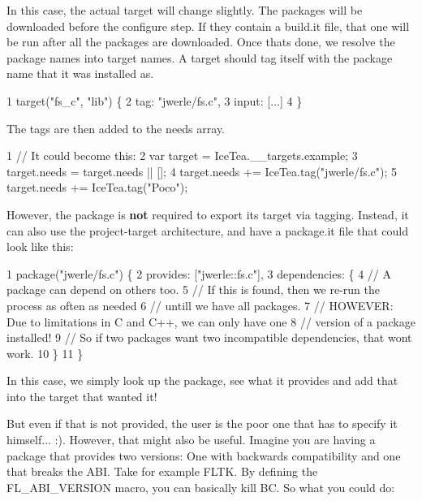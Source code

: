 In this case, the actual target will change slightly. The packages will be downloaded before the configure step. If they contain a {\ttfamily build.\+it} file, that one will be run after all the packages are downloaded. Once that\textquotesingle{}s done, we resolve the package names into target names. A target should tag itself with the package name that it was installed as.


\begin{DoxyCode}
1 target("fs\_c", "lib") \{
2     tag: "jwerle/fs.c",
3     input: [...]
4 \}
\end{DoxyCode}


The tags are then added to the {\ttfamily needs} array.


\begin{DoxyCode}
1 // It could become this:
2 var target = IceTea.\_\_targets.example;
3 target.needs = target.needs || [];
4 target.needs += IceTea.tag("jwerle/fs.c");
5 target.needs += IceTea.tag("Poco");
\end{DoxyCode}


However, the package is {\bfseries not} required to export it\textquotesingle{}s target via tagging. Instead, it can also use the project-\/target architecture, and have a {\ttfamily package.\+it} file that could look like this\+:


\begin{DoxyCode}
1 package("jwerle/fs.c") \{
2     provides: ["jwerle::fs.c"],
3     dependencies: \{
4         // A package can depend on others too.
5         // If this is found, then we re-run the process as often as needed
6         // untill we have all packages.
7         // HOWEVER: Due to limitations in C and C++, we can only have one
8         // version of a package installed!
9         // So if two packages want two incompatible dependencies, that wont work.
10     \}
11 \}
\end{DoxyCode}


In this case, we simply look up the package, see what it provides and add that into the target that wanted it!

But even if that is not provided, the user is the poor one that has to specify it himself... \+:). However, that might also be useful. Imagine you are having a package that provides two versions\+: One with backwards compatibility and one that breaks the A\+BI. Take for example F\+L\+TK. By defining the {\ttfamily F\+L\+\_\+\+A\+B\+I\+\_\+\+V\+E\+R\+S\+I\+ON} macro, you can basically kill BC. So what you could do\+:


